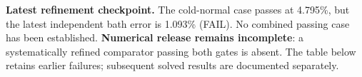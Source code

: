 \textbf{Latest refinement checkpoint.} The cold-normal case passes at 4.795\%, but the latest independent bath error is 1.093\% (FAIL). No combined passing case has been established. \textbf{Numerical release remains incomplete}: a systematically refined comparator passing both gates is absent. The table below retains earlier failures; subsequent solved results are documented separately.\par
